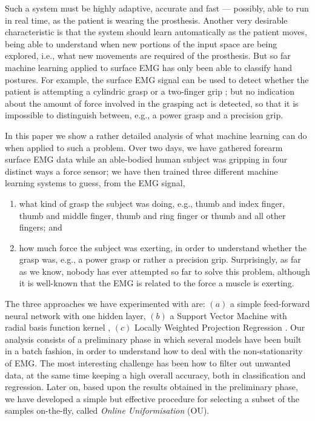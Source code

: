 Such a system must be highly adaptive, accurate and fast --- possibly,
able to run in real time, as the patient is wearing the prosthesis.
Another very desirable characteristic is that the system should learn
automatically as the patient moves, being able to understand when new
portions of the input space are being explored, i.e., what new
movements are required of the prosthesis. But so far machine learning
applied to surface EMG has only been able to classify hand postures.
For example, the surface EMG signal can be used to detect whether the
patient is attempting a cylindric grasp or a two-finger grip
\cite{ekvall}; but no indication about the amount of force involved in
the grasping act is detected, so that it is impossible to distinguish
between, e.g., a power grasp and a precision grip.

In this paper we show a rather detailed analysis of what machine
learning can do when applied to such a problem. Over two days, we have
gathered forearm surface EMG data while an able-bodied human subject
was gripping in four distinct ways a force sensor; we have then
trained three different machine learning systems to guess, from the
EMG signal,

\begin{enumerate}

  \item what kind of grasp the subject was doing, e.g., thumb and
    index finger, thumb and middle finger, thumb and ring finger or
    thumb and all other fingers; and

  \item how much force the subject was exerting, in order to
    understand whether the grasp was, e.g., a power grasp or rather a
    precision grip. Surprisingly, as far as we know, nobody has ever
    attempted so far to solve this problem, although it is well-known
    that the EMG is related to the force a muscle is exerting.

\end{enumerate}

The three approaches we have experimented with are:
$(a)$ a simple feed-forward neural network with one hidden layer,
$(b)$ a Support Vector Machine with radial basis function kernel
\cite{BGV92}, $(c)$ Locally Weighted Projection Regression
\cite{lwpr}. Our analysis consists of a preliminary phase in which
several models have been built in a batch fashion, in order to
understand how to deal with the non-stationarity of EMG. The most
interesting challenge has been how to filter out unwanted data, at the
same time keeping a high overall accuracy, both in classification and
regression. Later on, based upon the results obtained in the
preliminary phase, we have developed a simple but effective procedure
for selecting a subset of the samples on-the-fly, called \emph{Online
Uniformisation} (OU).

